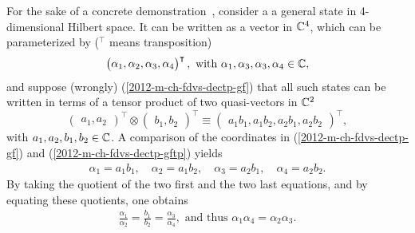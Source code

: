\documentclass[%
  twocolumn,
 showpacs,
 showkeys,
 preprintnumbers,
 amsmath,amssymb,
 aps,
  pra,
  longbibliography,
 floatfix,
 ]{revtex4-1}
\begin{document}
For the sake of a concrete demonstration~\cite[Section~1.5]{mermin-07},
consider a a general state in 4-dimensional Hilbert space.
It can be written as a vector in ${\Bbb C}^4$, which can be parameterized by
($^\intercal$ means transposition)
\begin{equation}
\begin{pmatrix}\alpha_1,\alpha_2,\alpha_3,\alpha_4\end{pmatrix}^\intercal , \textrm{ with } \alpha_1,\alpha_3,\alpha_3,\alpha_4 \in {\Bbb C},
\label{2012-m-ch-fdvs-dectp-gf}
\end{equation}
and suppose (wrongly)  (\ref{2012-m-ch-fdvs-dectp-gf}) that all such states can be written in terms of a tensor product of two quasi-vectors in  ${\Bbb C}^2$
\begin{equation}
\begin{pmatrix}a_1,a_2\end{pmatrix}^\intercal \otimes \begin{pmatrix}b_1,b_2\end{pmatrix}^\intercal
\equiv \begin{pmatrix}a_1b_1, a_1 b_2,a_2b_1,a_2b_2\end{pmatrix}^\intercal ,
\label{2012-m-ch-fdvs-dectp-gftp}
\end{equation}
with $a_1,a_2,b_1,b_2\in {\Bbb C}$.
A comparison of the coordinates in
(\ref{2012-m-ch-fdvs-dectp-gf})
and
(\ref{2012-m-ch-fdvs-dectp-gftp})
yields
\begin{equation}
\begin{split}
\alpha_1=a_1b_1,\quad
\alpha_2=a_1b_2,\quad
\alpha_3=a_2b_1,\quad
\alpha_4=a_2b_2.
\end{split}
\label{2012-m-ch-fdvs-dectp-gftp-a}
\end{equation}
By taking the quotient of the two first and the two last equations, and by equating these quotients, one obtains
\begin{equation}
\begin{split}
\frac{\alpha_1}{\alpha_2}=\frac{b_1}{b_2}
=\frac{\alpha_3}{\alpha_4},\textrm{ and thus }
{\alpha_1}{\alpha_4}={\alpha_2}{\alpha_3}.
\end{split}
\label{2012-m-ch-fdvs-dectp-gftp-fr}
\end{equation}
\end{document}
